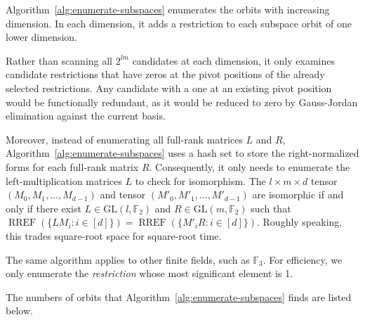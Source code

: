 \documentclass[11pt]{article}
\begin{document}
Algorithm~\ref{alg:enumerate-subspaces} enumerates the orbits with increasing dimension.
In each dimension, it adds a restriction to each subspace orbit of one lower dimension.

Rather than scanning all $2^{lm}$ candidates at each dimension, it only examines candidate restrictions that have zeros at the pivot positions of the already selected restrictions. Any candidate with a one at an existing pivot position would be functionally redundant, as it would be reduced to zero by Gauss-Jordan elimination against the current basis.

Moreover, instead of enumerating all full-rank matrices $L$ and $R$, Algorithm~\ref{alg:enumerate-subspaces} uses a hash set to store the right-normalized forms for each full-rank matrix $R$.
Consequently, it only needs to enumerate the left-multiplication matrices $L$ to check for isomorphism.
The $l\times m\times d$ tensor $(M_0, M_1, \ldots, M_{d-1})$ and tensor $(M'_0, M'_1, \ldots, M'_{d-1})$ are isomorphic if and only if there exist $L\in \mathrm{GL}(l,\mathbb{F}_2)$ and $R\in \mathrm{GL}(m,\mathbb{F}_2)$ such that $\operatorname{RREF}(\{L M_i : i\in [d]\}) = \operatorname{RREF}(\{M'_i R: i\in [d]\})$.
Roughly speaking, this trades square-root space for square-root time.

The same algorithm applies to other finite fields, such as $\mathbb{F}_3$. For efficiency, we only enumerate the \textit{restriction} whose most significant element is 1.

The numbers of orbits that Algorithm~\ref{alg:enumerate-subspaces} finds are listed below.
\end{document}
